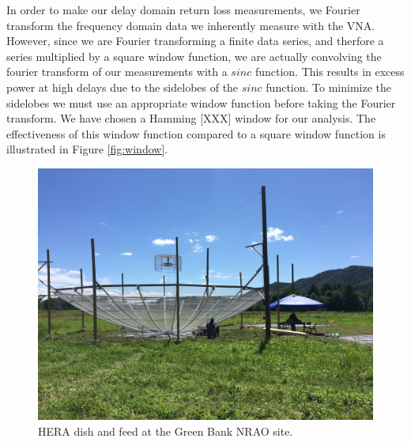\documentclass[12pt,preprint]{aastex}
\begin{document}

In order to make our delay domain return loss measurements, we Fourier transform
the frequency domain data we inherently measure with the VNA. However, since  we
are Fourier transforming a finite data series, and therfore a series multiplied
by a square window function, we are actually convolving the fourier transform of
our measurements with a $sinc$ function. This results in excess power at high
delays due to the sidelobes of the $sinc$ function. To minimize the sidelobes we
 must use an appropriate window function before taking the Fourier transform.
We have chosen a Hamming [XXX] window for our analysis. The effectiveness of this
window function compared to a square window function is illustrated in Figure
\ref{fig:window}.

\begin{figure}
\centering
\includegraphics[trim={2cm 20cm 30cm 15cm},clip, totalheight=0.3\textheight]{plots/heradish.jpg}
\caption{HERA dish and feed at the Green Bank NRAO site.}
\label{fig:heradish}
\end{figure}
\end{document}
